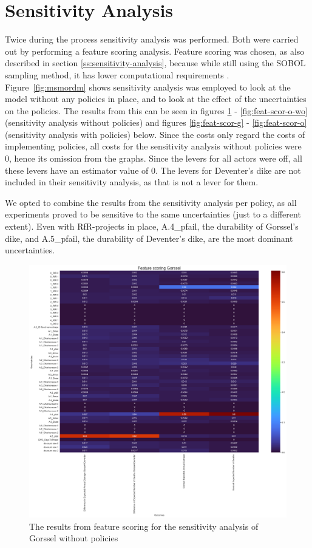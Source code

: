 \section{Sensitivity Analysis}
\label{a:sensitivity-analysis}

Twice during the process sensitivity analysis was performed. Both were carried out by performing a feature scoring analysis. Feature scoring was chosen, as also described in section \ref{ss:sensitivity-analysis}, because while still using the SOBOL sampling method, it has lower computational requirements \cite{jaxa-rozen_tree-based_2018}.
Figure~\ref{fig:msmordm} shows sensitivity analysis was employed to look at the model without any policies in place, and to look at the effect of the uncertainties on the policies. The results from this can be seen in figures \ref{fig:feat-scor-g-wo} - \ref{fig:feat-scor-o-wo} (sensitivity analysis without policies) and figures  \ref{fig:feat-scor-g} - \ref{fig:feat-scor-o} (sensitivity analysis with policies) below. Since the costs only regard the costs of implementing policies, all costs for the sensitivity analysis without policies were 0, hence its omission from the graphs. Since the levers for all actors were off, all these levers have an estimator value of 0. The levers for Deventer's dike are not included in their sensitivity analysis, as that is not a lever for them. 

We opted to combine the results from the sensitivity analysis per policy, as all experiments proved to be sensitive to the same uncertainties (just to a different extent). Even with RfR-projects in place, A.4\_pfail, the durability of Gorssel's dike, and A.5\_pfail, the durability of Deventer's dike, are the most dominant uncertainties.

\begin{figure}[h!]
    \centering
    \includegraphics[width=\textwidth]{report/figures/results/sa_model_Gorssel.png}
    \caption{The results from feature scoring for the sensitivity analysis of Gorssel without policies}
    \label{fig:feat-scor-g-wo}
\end{figure}

